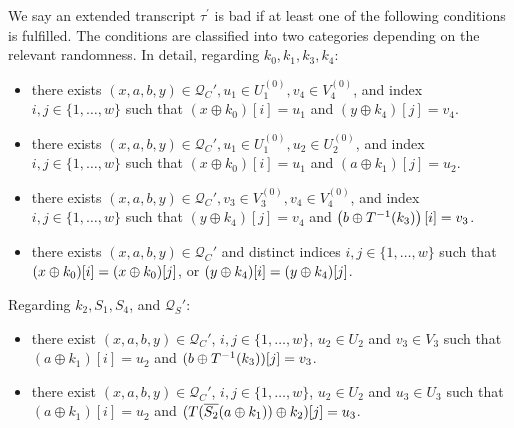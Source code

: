 \begin{definition}
\label{defn:bad-tau-4-rounds}

We say an extended transcript $\tau^{\prime}$ is bad if at least one of the following conditions is fulfilled. The conditions are classified into two categories depending on the relevant randomness. In detail, regarding $k_0,k_1,k_3,k_4$:
\begin{itemize}[leftmargin=10mm]
	\item[\bone]
	there exists $(x,a,b,y) \in \mathcal{Q}_{C}', u_1 \in U_1^{(0)}, v_4 \in V_4^{(0)}$, and index $i, j \in \{1, \ldots, w\}$ such that $\left(x \oplus k_{0}\right)[i]=u_1$ and $\left(y \oplus k_{4}\right)[j]=v_4$.
	\item[\btwo]
	there exists $(x,a,b,y) \in \mathcal{Q}_{C}', u_1 \in U_1^{(0)}, u_2\in U_2^{(0)}$, and index $i, j \in \{1, \ldots, w\}$ such that $\left(x \oplus k_{0}\right)[i]=u_1$ and $\left(a\oplus k_{1}\right)[j]=u_2$.
	\item[\bthree]
	there exists $(x,a,b,y) \in \mathcal{Q}_{C}', v_{3}\in V_3^{(0)}, v_{4}\in V_4^{(0)}$, and index $i, j \in \{1, \ldots, w\}$ such that $\left(y \oplus k_{4}\right)[j]=v_4$ and $\left(b\oplus T^{-1}(k_3)\right) [i]=v_3$.
	\item[\bfour]
	there exists $(x,a,b,y) \in \mathcal{Q}_{C}'$ and distinct indices $i, j \in \{1, \ldots, w\}$ such that $(x\oplus k_0)[i]=(x\oplus k_0)[j]$, or $(y\oplus k_4)[i]=(y\oplus k_4)[j]$.
\end{itemize}
%
%
Regarding $k_2,S_1,S_4$, and $\mathcal{Q}_S'$:
%
%
\begin{itemize}[leftmargin=10mm]
	\item[\bfive]
	there exist $(x,a,b,y) \in \mathcal{Q}_{C}'$, $i, j \in\{1, \ldots, w\}$, $u_{2} \in U_{2}$ and $v_{3} \in V_{3}$ such that $(a \oplus k_1)[i] = u_2$ and $(b\oplus T^{-1}(k_3))[j] = v_3$.
	\item[\bsix]
	there exist $(x,a,b,y) \in \mathcal{Q}_{C}'$, $i, j \in\{1, \ldots, w\}$, $u_{2} \in U_{2}$ and $u_{3} \in U_{3}$ such that $(a \oplus k_1)[i] = u_2$ and $(T(\overline{S_2}(a \oplus k_1))\oplus k_2)[j] = u_3$.

\end{itemize}
\end{definition}
